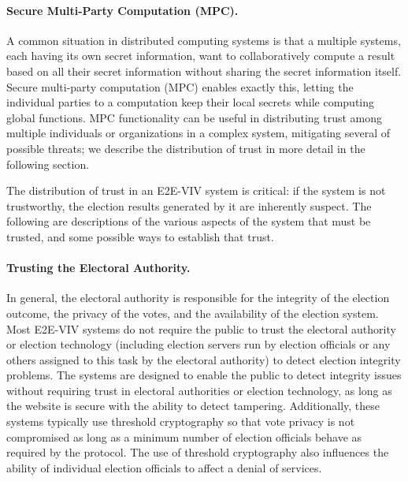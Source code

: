 \paragraph{Secure Multi-Party Computation (MPC).} A common situation
in distributed computing systems is that a multiple systems, each
having its own secret information, want to collaboratively compute a
result based on all their secret information without sharing the
secret information itself. Secure multi-party computation (MPC)
enables exactly this, letting the individual parties to a computation
keep their local secrets while computing global functions. MPC
functionality can be useful in distributing trust among multiple
individuals or organizations in a complex system, mitigating several
of possible threats; we describe the distribution of trust in more
detail in the following section.


\label{sec:trust}

The distribution of trust in an E2E-VIV system is critical: if the
system is not trustworthy, the election results generated by it are
inherently suspect. The following are descriptions of the various
aspects of the system that must be trusted, and some possible ways to
establish that trust.

\paragraph{Trusting the Electoral Authority.} 

In general, the electoral authority is responsible for the integrity
of the election outcome, the privacy of the votes, and the
availability of the election system. Most E2E-VIV systems do not
require the public to trust the electoral authority or election
technology (including election servers run by election officials or
any others assigned to this task by the electoral authority) to detect
election integrity problems. The systems are designed to enable the
public to detect integrity issues without requiring trust in electoral
authorities or election technology, as long as the website is secure
with the ability to detect tampering. Additionally, these systems
typically use threshold cryptography so that vote privacy is not
compromised as long as a minimum number of election officials behave
as required by the protocol. The use of threshold cryptography also
influences the ability of individual election officials to affect a
denial of services.

